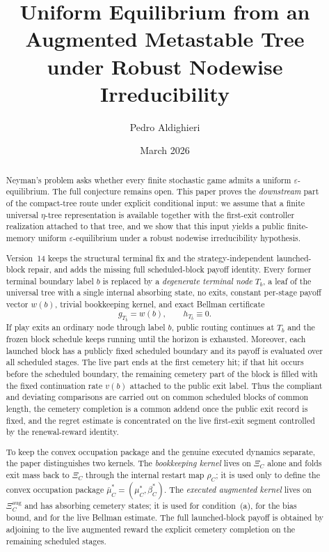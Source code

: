 \documentclass[12pt]{article}
\title{\textbf{Uniform Equilibrium from an Augmented Metastable Tree\\under Robust Nodewise Irreducibility}}
\author{Pedro Aldighieri}
\date{March 2026}
\theoremstyle{definition}
\newcommand{\eps}{\varepsilon}
\newcommand{\1}{\mathbf{1}}
\begin{document}
\maketitle



\begin{abstract}
Neyman's problem asks whether every finite stochastic game admits a uniform
$\eps$-equilibrium. The full conjecture remains open. This paper proves the
\emph{downstream} part of the compact-tree route under explicit conditional input:
we assume that a finite universal $\eta$-tree representation is available together
with the first-exit controller realization attached to that tree, and we show that
this input yields a public finite-memory uniform $\eps$-equilibrium under a robust
nodewise irreducibility hypothesis.

Version~14 keeps the structural terminal fix and the strategy-independent
launched-block repair, and adds the missing full scheduled-block payoff identity.
Every former terminal boundary label $b$ is replaced by a \emph{degenerate
terminal node} $T_b$, a leaf of the universal tree with a single internal
absorbing state, no exits, constant per-stage payoff vector $w(b)$, trivial
bookkeeping kernel, and exact Bellman certificate
\[
g_{T_b}=w(b),
\qquad
h_{T_b}\equiv 0.
\]
If play exits an ordinary node through label $b$, public routing continues at
$T_b$ and the frozen block schedule keeps running until the horizon is exhausted.
Moreover, each launched block has a publicly fixed scheduled boundary and its
payoff is evaluated over all scheduled stages. The live part ends at the first
cemetery hit; if that hit occurs before the scheduled boundary, the remaining
cemetery part of the block is filled with the fixed continuation rate $v(b)$
attached to the public exit label. Thus the compliant and deviating comparisons
are carried out on common scheduled blocks of common length, the cemetery
completion is a common addend once the public exit record is fixed, and the
regret estimate is concentrated on the live first-exit segment controlled by the
renewal-reward identity.

To keep the convex occupation package and the genuine executed dynamics separate,
the paper distinguishes two kernels. The \emph{bookkeeping kernel} lives on
$\Xi_C$ alone and folds exit mass back to $\Xi_C$ through the internal restart map
$\rho_C$; it is used only to define the convex occupation package
$\bar\mu_C^*=(\mu_C^*,\beta_C^*)$. The \emph{executed augmented kernel} lives on
$\Xi_C^{\mathrm{aug}}$ and has absorbing cemetery states; it is used for
condition~\textnormal{(a)}, for the bias bound, and for the live Bellman
estimate. The full launched-block payoff is obtained by adjoining to the live
augmented reward the explicit cemetery completion on the remaining scheduled
stages.


\end{abstract}
\end{document}
